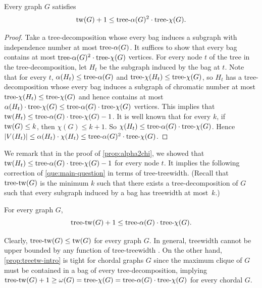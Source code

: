 \documentclass[a4paper, cleveref, autoref, thm-restate]{lipics-v2021}
\newcommand{\tw}{{\rm tw}}
\newcommand{\treea}{{\rm tree}\textnormal{-}\alpha}
\newcommand{\treex}{{\rm tree}\textnormal{-}\chi}
\begin{document}
\begin{proposition} \label{prop:alpha2chi}
  Every graph $G$ satisfies
  $$\tw(G)+1 \leq \treea(G)^{2} \cdot \treex(G)\text{.}$$
\end{proposition}

\begin{proof}
  Take a tree-decomposition whose every bag induces a subgraph with independence number at most $\treea(G)$.
  It suffices to show that every bag contains at most $\treea(G)^{2} \cdot \treex(G)$ vertices.
  For every node $t$ of the tree in the tree-decomposition, let $H_t$ be the subgraph induced by the bag at $t$.
  Note that for every $t$, $\alpha(H_t) \leq \treea(G)$ and $\treex(H_t) \leq \treex(G)$, so $H_t$ has a tree-decomposition whose every bag induces a subgraph of chromatic number at most $\treex(H_t) \leq \treex(G)$ and hence contains at most $\alpha(H_t) \cdot \treex(G) \leq \treea(G) \cdot \treex(G)$ vertices.
  This implies that $\tw(H_t) \leq \treea(G) \cdot \treex(G)-1$.
  It is well known that for every $k$, if $\tw(G) \leq k$, then $\chi(G) \leq k + 1$.
  So $\chi(H_t) \leq \treea(G) \cdot \treex(G)$.
  Hence $|V(H_t)| \leq \alpha(H_t) \cdot \chi(H_t) \leq \treea(G)^2 \cdot \treex(G)$. 
\end{proof}


We remark that in the proof of \cref{prop:alpha2chi}, we showed that $\tw(H_t) \leq \treea(G) \cdot \treex(G)-1$ for every node $t$.
It implies the following correction of \cref{que:main-question} in terms of tree-treewidth.
(Recall that ${\rm tree}\textnormal{-}\tw(G)$ is the minimum $k$ such that there exists a tree-decomposition of $G$ such that every subgraph induced by a bag has treewidth at most~$k$.)

\begin{proposition} \label{prop:treetw-intro}
    For every graph $G$,
    $${\rm tree}\textnormal{-}\tw(G)+1 \leq \treea(G) \cdot \treex(G)\text{.}$$
\end{proposition}

Clearly, ${\rm tree}\textnormal{-}\tw(G) \leq \tw(G)$ for every graph $G$.
In general, treewidth cannot be upper bounded by any function of tree-treewidth \cite{LNW-24}.
On the other hand, \cref{prop:treetw-intro} is tight for chordal graphs $G$ since the maximum clique of $G$ must be contained in a bag of every tree-decomposition, implying ${\rm tree}\textnormal{-}\tw(G) +1 \geq \omega(G) = \treex(G) = \treea(G) \cdot \treex(G)$ for every chordal $G$.
\end{document}

